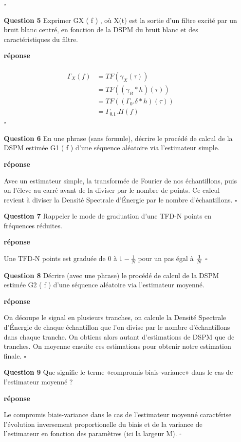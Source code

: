 \documentclass{article}
\newcommand{\debutrep}[1]{\color{blue}\begin{center} \hrulefill \textbf{ #1 } \hrulefill \end{center} }
\newcommand{\finrep}{\vspace*{5mm}\hfill $\square$\color{black}\vspace*{5mm}}
\begin{document}
\begin{itemize}
\finrep

\item[{\bf Question 5}] Exprimer GX ( f ) , où X(t) est la sortie d’un filtre excité par un bruit blanc centré, en fonction de la DSPM du bruit blanc et des caractéristiques du filtre.

\debutrep{réponse}
\[
    \begin{split}\\
        \Gamma_X(f) &= TF(\gamma_X(\tau))       \\
        &= TF\left((\gamma_B * h)(\tau)\right)  \\
        &= TF\left((\Gamma_0.\delta * h)(\tau)\right) \\
        &= \Gamma_0.1.H(f)
    \end{split}
\]
\finrep

\item[{\bf Question 6}] En une phrase (sans formule), décrire le procédé de calcul de la DSPM estimée G1 ( f )
d’une séquence aléatoire via l’estimateur simple.

\debutrep{réponse}
Avec un estimateur simple, la transformée de Fourier de nos échantillons, puis on l'éleve au carré avant de la diviser par le nombre de points.
Ce calcul revient à diviser la Densité Spectrale d'Énergie par le nombre d'échantillons.
\finrep

\item[{\bf Question 7}] Rappeler le mode de graduation d’une TFD-N points en fréquences réduites.
\debutrep{réponse}
Une TFD-N points est graduée de $0$ à $1 - \frac{1}{N}$ pour un pas égal à $1\over N$
\finrep

\item[{\bf Question 8}] Décrire (avec une phrase) le procédé de calcul de la DSPM estimée G2 ( f ) d’une
séquence aléatoire via l’estimateur moyenné.

\debutrep{réponse}
On découpe le signal en plusieurs tranches, on calcule la Densité Spectrale d'Énergie de chaque échantillon que l'on divise par le nombre d'échantillons dans chaque tranche.\newline
On obtiens alors autant d'estimations de DSPM que de tranches. On moyenne ensuite ces estimations pour obtenir notre estimation finale.
\finrep

\item[{\bf Question 9}] Que signifie le terme «compromis biais-variance» dans le cas de l’estimateur moyenné ?

\debutrep{réponse}
Le compromis biais-variance dans le cas de l'estimateur moyenné caractérise l'évolution inversement proportionelle du biais et de la variance de l'estimateur en fonction des paramètres (ici la largeur M).
\finrep


\end{itemize}
\end{document}
